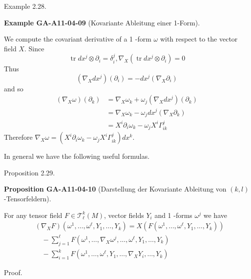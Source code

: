 \documentclass[10pt, letterpaper]{article}
\newcommand{\CustomHeading}[3]{%
  \par\medskip\noindent%
  \textbf{#1 #2} \textnormal{(#3)}.\enskip%
}
\newenvironment{PROP}[2]{\begin{unitbox}\CustomHeading{Proposition}{#1}{#2}}{\end{unitbox}}
\newenvironment{EXA}[2]{\begin{unitbox}\CustomHeading{Example}{#1}{#2}}{\end{unitbox}}
\begin{document}
Example 2.28. 

\begin{EXA}{GA-A11-04-09}{Kovariante Ableitung einer 1-Form}
We compute the covariant derivative of a 1 -form $\omega$ with respect to the vector field $X$. Since 
$$\operatorname{tr} d x^{j} \otimes \partial_{i}=\delta_{i}^{j}, \nabla_{X}\left(\operatorname{tr} d x^{j} \otimes \partial_{i}\right)=0$$ 
Thus 
$$\left(\nabla_{X} d x^{j}\right)\left(\partial_{i}\right)=-d x^{j}\left(\nabla_{X} \partial_{i}\right)$$ 
and so
$$
\begin{aligned}
\left(\nabla_{X} \omega\right)\left(\partial_{k}\right) & =\nabla_{X} \omega_{k}+\omega_{j}\left(\nabla_{X} d x^{j}\right)\left(\partial_{k}\right) \\
& =\nabla_{X} \omega_{k}-\omega_{j} d x^{j}\left(\nabla_{X} \partial_{k}\right) \\
& =X^{i} \partial_{i} \omega_{k}-\omega_{j} X^{i} \Gamma_{i k}^{j}
\end{aligned}
$$
Therefore $\nabla_{X} \omega=\left(X^{i} \partial_{i} \omega_{k}-\omega_{j} X^{i} \Gamma_{i k}^{j}\right) d x^{k}$.
\end{EXA}


In general we have the following useful formulas.


Proposition 2.29. 

\begin{PROP}{GA-A11-04-10}{Darstellung der Kovariante Ableitung von $(k,l)$-Tensorfeldern}
For any tensor field $F \in \mathscr{T}_{\ell}^{k}(M)$, vector fields $Y_{i}$ and 1 -forms $\omega^{j}$ we have
$$
\begin{aligned}
& \left(\nabla_{X} F\right)\left(\omega^{1}, \ldots, \omega^{\ell}, Y_{1}, \ldots, Y_{k}\right)=X\left(F\left(\omega^{1}, \ldots, \omega^{\ell}, Y_{1}, \ldots, Y_{k}\right)\right) \\
& \quad-\sum_{j=1}^{\ell} F\left(\omega^{1}, \ldots, \nabla_{X} \omega^{j}, \ldots, \omega^{\ell}, Y_{1}, \ldots, Y_{k}\right) \\
& \quad-\sum_{i=1}^{k} F\left(\omega^{1}, \ldots, \omega^{\ell}, Y_{1}, \ldots, \nabla_{X} Y_{i}, \ldots, Y_{k}\right)
\end{aligned}
$$
\end{PROP}


Proof. 
\end{document}

